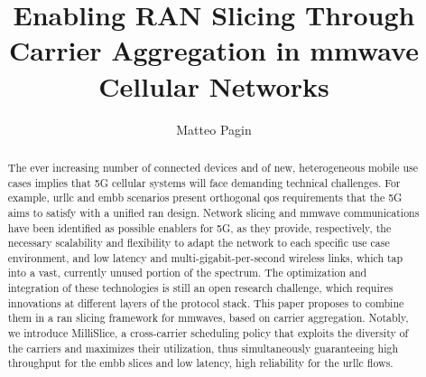 \documentclass[a4paper, 11pt, oneside]{article}
\begin{document}
\title{\huge Enabling RAN Slicing Through Carrier Aggregation in \gls{mmwave} Cellular Networks} %
\author[1]{\Large Matteo Pagin}

\maketitle

\thispagestyle{empty}

\begin{abstract}
  The ever increasing number of connected devices and of new, heterogeneous mobile use cases implies that 5G cellular systems will face demanding technical challenges. For example, \gls{urllc} and \gls{embb} scenarios present orthogonal \gls{qos} requirements that the 5G aims to satisfy with a unified \gls{ran} design. Network slicing and \gls{mmwave} communications have been identified as possible enablers for 5G, as they provide, respectively, the necessary scalability and flexibility to adapt the network to each specific use case environment, and low latency and multi-gigabit-per-second wireless links, which tap into a vast, currently unused portion of the spectrum.
  The optimization and integration of these technologies is still an open research challenge, which requires innovations at different layers of the protocol stack. This paper proposes to combine them in a \gls{ran} slicing framework for \glspl{mmwave}, based on carrier aggregation. Notably, we introduce MilliSlice, a cross-carrier scheduling policy that exploits the diversity of the carriers and maximizes their utilization, thus simultaneously guaranteeing high throughput for the \gls{embb} slices and low latency, high reliability for the \gls{urllc} flows.
\end{abstract}
\end{document}
